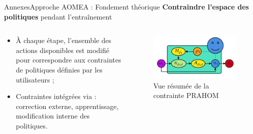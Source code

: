\begin{frame}[allowframebreaks]{Annexes}{Approche AOMEA : Fondement théorique}
    \textbf{Contraindre l'espace des politiques} pendant l'entraînement

    \begin{columns}
    
        \begin{column}{0.3\textwidth}
    
            \begin{itemize}
                \item À chaque étape, l'ensemble des actions disponibles est modifié pour correspondre aux contraintes de politiques définies par les utilisateurs ;
                \item Contraintes intégrées via : correction externe, apprentissage, modification interne des politiques.
            \end{itemize}
    
        \end{column}
    
        \begin{column}{0.8\textwidth}
            \begin{figure}
                \centering
                \includegraphics[width=0.7\linewidth]{figures/prahom_training_constrain.png}
                \caption*{Vue résumée de la contrainte PRAHOM}
                \label{fig:prahom_process}
            \end{figure}
        \end{column}
    
    \end{columns}
\end{frame}
    

